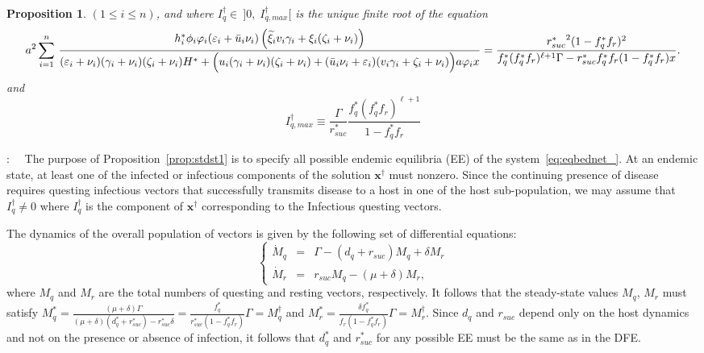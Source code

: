 \documentclass[a4paper]{article}
\newcommand{\dsum}{\displaystyle\sum}
\newcommand{\varpiVar}{r_{suc}}
\newcommand{\IqstarmaxVar}{I_{q,max}^{\dagger}}
\newcommand{\hatmuVar}{d_q}
\newtheorem{prop}{Proposition}[section]
\begin{document}
\begin{prop}
$(1\leqslant i\leqslant n)$, and where $I_q^\dagger \in~\big]0,\;\IqstarmaxVar \big[$ is the unique finite root of the equation \begin{equation}\small\label{eq:eqeqIQ}a^2\dsum_{i=1}^n\, \frac{h_i^*\phi_i\varphi_i (\varepsilon_i+\bar u_i\nu_i)\left(\widetilde\xi_iv_i\gamma_i+\xi_i(\zeta_i+\nu_i)\right)}{ (\varepsilon_i+\nu_i)(\gamma_i+\nu_i)(\zeta_i+\nu_i)H^* + \Big(u_i(\gamma_i+\nu_i)(\zeta_i+\nu_i) + (\bar u_i\nu_i+\varepsilon_i)(v_i\gamma_i + \zeta_i+\nu_i) \Big)a\varphi_i x}
=\dfrac{{\varpiVar ^*}^2(1-f^*_qf_r)^2 }{f^*_q(f^*_qf_r)^{\ell+1}\Gamma-\varpiVar ^* f^*_qf_r (1-f^*_qf_r)x }.
\end{equation}
and
\begin{equation}\label{eq:Iq-bar}
\IqstarmaxVar  \equiv \frac{\Gamma}{\varpiVar ^*}\frac{f^*_q(f^*_qf_r)^{\ell+1}}{1-f^*_qf_r}
\end{equation}
\end{prop}


:~~
The purpose of Proposition~\ref{prop:stdst1} is to specify all  possible endemic equilibria (EE) of the system~\eqref{eq:eqbednet_}.
At an endemic state, at  least one of the infected or infectious components of the solution  $\mathbf x^\dagger $ must nonzero.  Since the continuing presence of disease requires questing infectious vectors that successfully transmits disease to a host in one of the host sub-population, we may assume that $I_q^\dagger \neq0$ where $I_q^\dagger $ is the component of $\mathbf x^\dagger $  corresponding to the Infectious questing vectors.

The dynamics of the overall population of vectors is given by the following set of differential equations: \begin{equation}\left\{\begin{array}{ccl}\dot M_q&=&\Gamma-(\hatmuVar +\varpiVar )M_q+\delta M_r\\\dot M_r &=&\varpiVar  M_q-(\mu+\delta)M_r,\end{array}\right.
\end{equation}
where $M_q$ and $M_r$ are the total numbers of questing and resting vectors, respectively.
It follows that the steady-state values  $M_q$,  $M_r$  must satisfy $M_q^*=\frac{(\mu+\delta)\Gamma}{(\mu+\delta)(\hatmuVar ^*+\varpiVar ^*)-\varpiVar ^*\delta}=\frac{f^*_q}{\varpiVar ^*(1-f^*_qf_r)}\Gamma = M_q^\dagger$  and   $M_r^* =\frac{\delta f^*_q}{f_r(1-f^*_qf_r)}\Gamma = M_r^\dagger$. Since $\hatmuVar$ and $\varpiVar $ depend only on the host dynamics and not on the presence or absence of infection, it follows that $\hatmuVar^*$ and $\varpiVar ^*$ for any possible EE must be the same as in the DFE.
\end{document}
